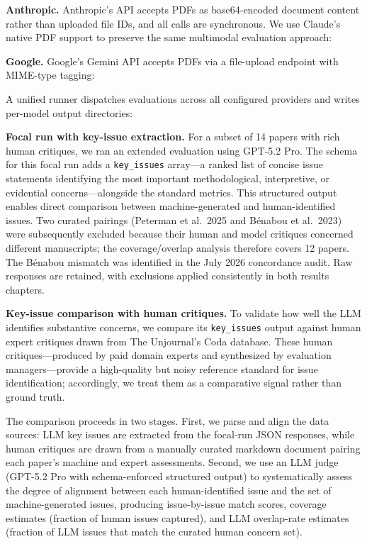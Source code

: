 \documentclass[
  11pt,
  letterpaper,
]{article}
\begin{document}
\textbf{Anthropic.} Anthropic's API accepts PDFs as base64-encoded
document content rather than uploaded file IDs, and all calls are
synchronous. We use Claude's native PDF support to preserve the same
multimodal evaluation approach:

\textbf{Google.} Google's Gemini API accepts PDFs via a file-upload
endpoint with MIME-type tagging:

A unified runner dispatches evaluations across all configured providers
and writes per-model output directories:

\textbf{Focal run with key-issue extraction.} For a subset of 14 papers
with rich human critiques, we ran an extended evaluation using GPT-5.2
Pro. The schema for this focal run adds a \texttt{key\_issues} array---a
ranked list of concise issue statements identifying the most important
methodological, interpretive, or evidential concerns---alongside the
standard metrics. This structured output enables direct comparison
between machine-generated and human-identified issues. Two curated
pairings (Peterman et al.~2025 and Bénabou et al.~2023) were
subsequently excluded because their human and model critiques concerned
different manuscripts; the coverage/overlap analysis therefore covers 12
papers. The Bénabou mismatch was identified in the July 2026 concordance
audit. Raw responses are retained, with exclusions applied consistently
in both results chapters.

\textbf{Key-issue comparison with human critiques.} To validate how well
the LLM identifies substantive concerns, we compare its
\texttt{key\_issues} output against human expert critiques drawn from
The Unjournal's Coda database. These human critiques---produced by paid
domain experts and synthesized by evaluation managers---provide a
high-quality but noisy reference standard for issue identification;
accordingly, we treat them as a comparative signal rather than ground
truth.

The comparison proceeds in two stages. First, we parse and align the
data sources: LLM key issues are extracted from the focal-run JSON
responses, while human critiques are drawn from a manually curated
markdown document pairing each paper's machine and expert assessments.
Second, we use an LLM judge (GPT-5.2 Pro with schema-enforced structured
output) to systematically assess the degree of alignment between each
human-identified issue and the set of machine-generated issues,
producing issue-by-issue match scores, coverage estimates (fraction of
human issues captured), and LLM overlap-rate estimates (fraction of LLM
issues that match the curated human concern set).
\end{document}
